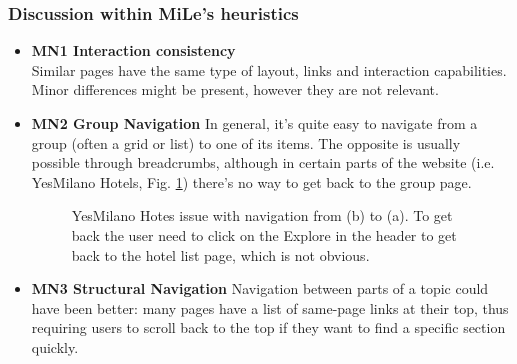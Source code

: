 \subsubsection{Discussion within MiLe's heuristics}
\begin{itemize}
    \item \textbf{MN1 Interaction consistency}\\
        Similar pages have the same type of layout, links and interaction capabilities. Minor differences might be present, however they are not relevant.
    \item \textbf{MN2 Group Navigation}
        In general, it's quite easy to navigate from a group (often a grid or list) to one of its items. The opposite is usually possible through breadcrumbs, although in certain parts of the website (i.e. YesMilano Hotels, Fig. \ref{fig:MN2-1}) there's no way to get back to the group page.
        \begin{figure}[!ht]
            \centering
            \qquad
            \caption{YesMilano Hotes issue with navigation from (b) to (a). To get back the user need to click on the Explore in the header to get back to the hotel list page, which is not obvious.}%
            \label{fig:MN2-1}%
        \end{figure}
    \item \textbf{MN3 Structural Navigation}
        Navigation between parts of a topic could have been better: many pages have a list of same-page links at their top, thus requiring users to scroll back to the top if they want to find a specific section quickly. 


\end{itemize}
